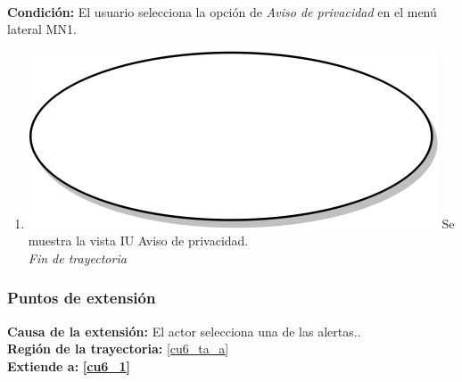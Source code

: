 \textbf{} \\
\textbf{Condición:} El usuario selecciona la opción de \textit{Aviso de privacidad} en el menú lateral MN1. \\
 \begin{enumerate}[label=H\arabic*]
    \item {\includegraphics[scale=.05]{Capitulo3/img/proceso.png} Se muestra la vista IU Aviso de privacidad.} \\
    \textit{Fin de trayectoria} \\
\end{enumerate}

\subsubsection{Puntos de extensión}
\noindent \textbf{Causa de la extensión:}  El actor selecciona una de las alertas.. \\
\textbf{Región de la trayectoria:} \ref{cu6_ta_a} \\
\textbf{Extiende a:} \textbf{\ref{cu6_1}}
